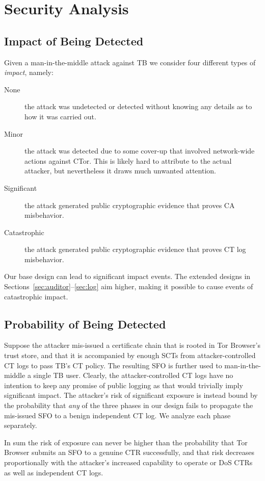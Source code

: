 \section{Security Analysis} \label{sec:analysis}

\subsection{Impact of Being Detected} \label{sec:analysis:impact}
Given a man-in-the-middle attack against TB we consider four
different types of \emph{impact}, namely:
\begin{description}
	\item[None] the attack was undetected or detected without knowing any
		details as to how it was carried out.
	\item[Minor] the attack was detected due to some cover-up that involved
		network-wide actions against CTor.  This is likely hard to attribute to
		the actual attacker, but nevertheless it draws much unwanted attention.
	\item[Significant] the attack generated public cryptographic evidence
		that proves CA misbehavior.
	\item[Catastrophic] the attack generated public cryptographic evidence
		that proves CT log misbehavior.
\end{description}

Our base design can lead to significant impact events.  The extended designs in
Sections~\ref{sec:auditor}--\ref{sec:log} aim higher, making it possible to
cause events of catastrophic impact.

\subsection{Probability of Being Detected} \label{sec:analysis:pr}
Suppose the attacker mis-issued a certificate chain that is rooted in Tor
Browser's trust store, and that it is accompanied by enough SCTs from
attacker-controlled CT logs to pass TB's CT policy.  The resulting SFO
is further used to man-in-the-middle a single TB user.  Clearly, the
attacker-controlled CT logs have no intention to keep any promise of public
logging as that would trivially imply significant impact.  The attacker's risk
of significant exposure is instead bound by the probability that \emph{any} of
the three phases in our design fails to propagate the mis-issued SFO to a benign
independent CT log.  We analyze each phase separately.

In sum the risk of exposure can never be higher than the probability that Tor
Browser submits an SFO to a genuine CTR successfully, and that risk decreases
proportionally with the attacker's increased capability to operate or DoS CTRs
as well as independent CT logs.

